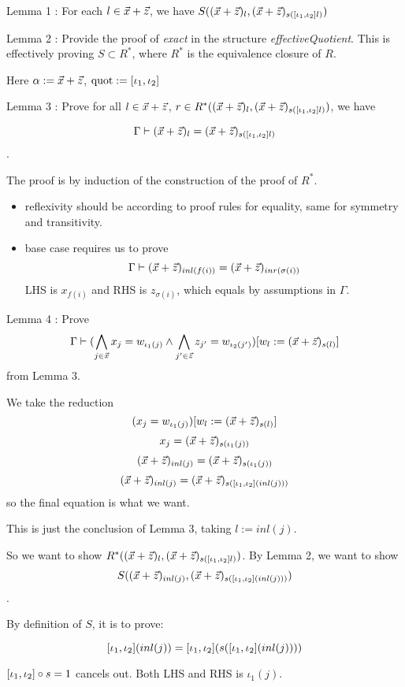 Lemma 1 : For each $l\in \vec{x}+\vec{z}$, we have $S((\vec{x}+\vec{z})_l, (\vec{x}+\vec{z})_{s([\iota_1,\iota_2] l)})$

Lemma 2 : Provide the proof of \emph{exact} in the structure \emph{effectiveQuotient}. This is effectively proving $S\subset R^*$, where $R^*$ is the equivalence closure of $R$.

Here $\alpha:= \vec{x}+\vec{z}$, $\text{quot}:= [\iota_1,\iota_2]$

Lemma 3 : Prove for all $l\in \vec{x}+\vec{z}$, $r\in R^*((\vec{x}+\vec{z})_l,(\vec{x}+\vec{z})_{s([\iota_1,\iota_2] l)})$, we have


\[\Gamma \vdash (\vec{x}+\vec{z})_l = (\vec{x}+\vec{z})_{s([\iota_1,\iota_2] l)}\].

The proof is by induction of the construction of the proof of $R^*$.

\begin{itemize}
    \item reflexivity should be according to proof rules for equality, same for symmetry and transitivity.
    \item base case requires us to prove
    \[\Gamma\vdash (\vec{x}+\vec{z})_{inl(f(i))} = (\vec{x}+\vec{z})_{inr(\sigma(i))}\]
    LHS is $x_{f(i)}$ and RHS is $z_{\sigma(i)}$, which equals by assumptions in $\Gamma$.
\end{itemize}

Lemma 4 : Prove
\[\Gamma \vdash (\bigwedge_{j\in\vec{x}}x_j = w_{\iota_1(j)}\land \bigwedge_{j'\in\vec{z}}z_{j'}= w_{\iota_2(j')}) [w_l:=(\vec{x}+\vec{z})_{s(l)}] \]
from Lemma 3.

We take the reduction
\[(x_j = w_{\iota_1(j)}) [w_l:=(\vec{x}+\vec{z})_{s(l)}]\]
\[x_j = (\vec{x}+\vec{z})_{s(\iota_1(j))}\]
\[(\vec{x}+\vec{z})_{inl(j)} = (\vec{x}+\vec{z})_{s(\iota_1(j))}\]
\[(\vec{x}+\vec{z})_{inl(j)} = (\vec{x}+\vec{z})_{s([\iota_1,\iota_2] (inl(j)))}\]
so the final equation is what we want.

This is just the conclusion of Lemma 3, taking $l := inl(j)$.

So we want to show $R^*((\vec{x}+\vec{z})_l,(\vec{x}+\vec{z})_{s([\iota_1,\iota_2] l)})$. By Lemma 2, we want to show \[S((\vec{x}+\vec{z})_{inl(j)},(\vec{x}+\vec{z})_{s([\iota_1,\iota_2] (inl(j)))})\].

By definition of $S$, it is to prove:

\[[\iota_1,\iota_2] (inl(j)) = [\iota_1,\iota_2] (s([\iota_1,\iota_2] (inl(j)))) \]

$[\iota_1,\iota_2]\circ s = 1$ cancels out. Both LHS and RHS is $\iota_1(j)$.

